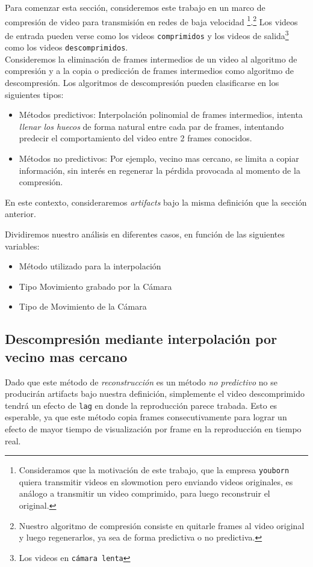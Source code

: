 Para comenzar esta sección, consideremos este trabajo en un marco de compresión de video para transmisión en redes de baja velocidad \footnote{Consideramos que la motivación de este trabajo, que la empresa \texttt{youborn} quiera transmitir videos en slowmotion pero enviando videos originales, es análogo a transmitir un video comprimido, para luego reconstruir el original.}.\footnote{Nuestro algoritmo de compresión consiste en quitarle frames al video original y luego regenerarlos, ya sea de forma predictiva o no predictiva.} Los videos de entrada pueden verse como los videos \texttt{comprimidos} y los videos de salida\footnote{Los videos en \texttt{cámara lenta}} como los videos \texttt{descomprimidos}.\\

Consideremos la eliminación de frames intermedios de un video al algoritmo de compresión y a la copia o predicción de frames intermedios como algoritmo de descompresión. Los algoritmos de descompresión pueden clasificarse en los siguientes tipos:
\begin{itemize}
	\item Métodos predictivos: Interpolación polinomial de frames intermedios, intenta \emph{llenar los huecos} de forma natural entre cada par de frames, intentando predecir el comportamiento del video entre 2 frames conocidos.
	\item Métodos no predictivos: Por ejemplo, vecino mas cercano, se limita a copiar información, sin interés en regenerar la pérdida provocada al momento de la compresión.
\end{itemize}

En este contexto, consideraremos \emph{artifacts} bajo la misma definición que la sección anterior.

Dividiremos nuestro análisis en diferentes casos, en función de las siguientes variables:
\begin{itemize}
	\item Método utilizado para la interpolación
	\item Tipo Movimiento grabado por la Cámara
	\item Tipo de Movimiento de la Cámara
\end{itemize}

\subsection{Descompresión mediante interpolación por vecino mas cercano}
Dado que este método de \emph{reconstrucción} es un método \emph{no predictivo} no se producirán artifacts bajo nuestra definición, simplemente el video descomprimido tendrá un efecto de \texttt{lag} en donde la reproducción parece trabada. Esto es esperable, ya que este método copia frames consecutivamente para lograr un efecto de mayor tiempo de visualización por frame en la reproducción en tiempo real. 

